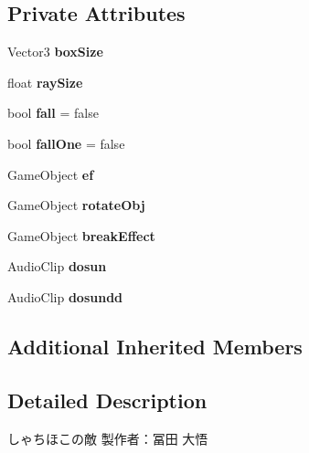 \subsection*{Private Attributes}
\begin{DoxyCompactItemize}
\item 
\mbox{\label{class_syatihoko_a750098527ec642ea9ff177a3d206ffd0}} 
Vector3 {\bfseries box\+Size}
\item 
\mbox{\label{class_syatihoko_aafc289a3406054796bc12bbbe4e57965}} 
float {\bfseries ray\+Size}
\item 
\mbox{\label{class_syatihoko_a2dde0a0439a95e4c6e56444a50d25a73}} 
bool {\bfseries fall} = false
\item 
\mbox{\label{class_syatihoko_a669b07305c8ae1a9c87c79a10e6869d8}} 
bool {\bfseries fall\+One} = false
\item 
\mbox{\label{class_syatihoko_a16293f96920923584e59c14881c23f05}} 
Game\+Object {\bfseries ef}
\item 
\mbox{\label{class_syatihoko_aa8d4ba1258d9f14331fe8bc469e9d677}} 
Game\+Object {\bfseries rotate\+Obj}
\item 
\mbox{\label{class_syatihoko_a7826e5d048e12b0ed2238fa82c2fb9e3}} 
Game\+Object {\bfseries break\+Effect}
\item 
\mbox{\label{class_syatihoko_adc1af0fbe4e7dd3fc79791e32ba00746}} 
Audio\+Clip {\bfseries dosun}
\item 
\mbox{\label{class_syatihoko_a2ed2d350634701e580f67d729ad519db}} 
Audio\+Clip {\bfseries dosundd}
\end{DoxyCompactItemize}
\subsection*{Additional Inherited Members}


\subsection{Detailed Description}
しゃちほこの敵 製作者：冨田 大悟 



